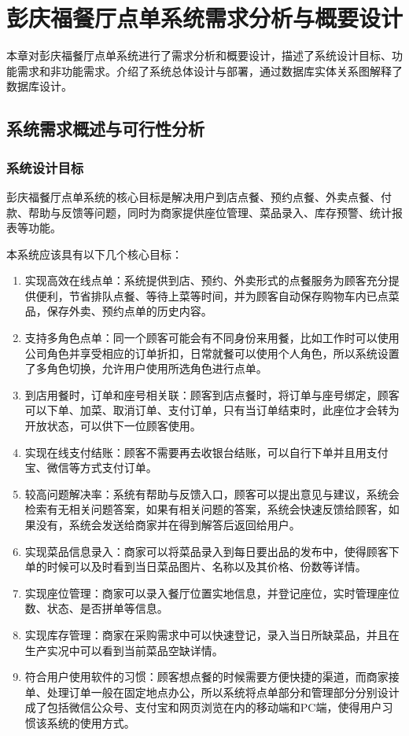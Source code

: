 \chapter{彭庆福餐厅点单系统需求分析与概要设计}
本章对彭庆福餐厅点单系统进行了需求分析和概要设计，描述了系统设计目标、功能需求和非功能需求。介绍了系统总体设计与部署，通过数据库实体关系图解释了数据库设计。

\section{系统需求概述与可行性分析}
\subsection{系统设计目标}
彭庆福餐厅点单系统的核心目标是解决用户到店点餐、预约点餐、外卖点餐、付款、帮助与反馈等问题，同时为商家提供座位管理、菜品录入、库存预警、统计报表等功能。

本系统应该具有以下几个核心目标：
\begin{enumerate}
  \item 实现高效在线点单：系统提供到店、预约、外卖形式的点餐服务为顾客充分提供便利，节省排队点餐、等待上菜等时间，并为顾客自动保存购物车内已点菜品，保存外卖、预约点单的历史内容。
  \item 支持多角色点单：同一个顾客可能会有不同身份来用餐，比如工作时可以使用公司角色并享受相应的订单折扣，日常就餐可以使用个人角色，所以系统设置了多角色切换，允许用户使用所选角色进行点单。
  \item 到店用餐时，订单和座号相关联：顾客到店点餐时，将订单与座号绑定，顾客可以下单、加菜、取消订单、支付订单，只有当订单结束时，此座位才会转为开放状态，可以供下一位顾客使用。
  \item 实现在线支付结账：顾客不需要再去收银台结账，可以自行下单并且用支付宝、微信等方式支付订单。
  \item 较高问题解决率：系统有帮助与反馈入口，顾客可以提出意见与建议，系统会检索有无相关问题答案，如果有相关问题的答案，系统会快速反馈给顾客，如果没有，系统会发送给商家并在得到解答后返回给用户。
  \item 实现菜品信息录入：商家可以将菜品录入到每日要出品的发布中，使得顾客下单的时候可以及时看到当日菜品图片、名称以及其价格、份数等详情。
  \item 实现座位管理：商家可以录入餐厅位置实地信息，并登记座位，实时管理座位数、状态、是否拼单等信息。
  \item 实现库存管理：商家在采购需求中可以快速登记，录入当日所缺菜品，并且在生产实况中可以看到当前菜品空缺详情。
  \item 符合用户使用软件的习惯：顾客想点餐的时候需要方便快捷的渠道，而商家接单、处理订单一般在固定地点办公，所以系统将点单部分和管理部分分别设计成了包括微信公众号、支付宝和网页浏览在内的移动端和PC端，使得用户习惯该系统的使用方式。
\end{enumerate}

